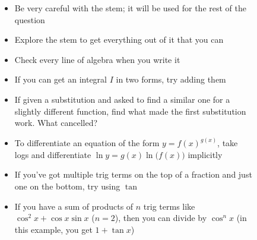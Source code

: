 \documentclass[../main.tex]{subfile}
\begin{document}

\begin{figure}[h]
\centering
\begin{minipage}{0.85\linewidth}


\begin{itemize}
	\item Be very careful with the stem; it will be used for the rest of the question
	\item Explore the stem to get everything out of it that you can
	\item Check every line of algebra when you write it
\end{itemize}


\begin{itemize}
	\item If you can get an integral $I$ in two forms, try adding them
	\item If given a substitution and asked to find a similar one for a slightly different function, find what made the first substitution work. What cancelled?
	\item To differentiate an equation of the form $y = f(x)^{g(x)}$, take logs and differentiate $\ln y = g(x) \ln\big(f(x)\big)$ implicitly
\end{itemize}


\begin{itemize}
	\item If you've got multiple trig terms on the top of a fraction and just one on the bottom, try using $\tan$
	\item If you have a sum of products of $n$ trig terms like $\cos^2 x + \cos x\sin x$ ($n = 2$), then you can divide by $\cos^n x$ (in this example, you get $1 + \tan x$)
\end{itemize}

\end{minipage}
\end{figure}
\end{document}
